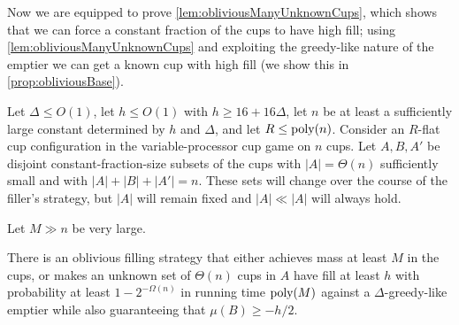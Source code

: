 Now we are equipped to prove \cref{lem:obliviousManyUnknownCups},
which shows that we can force a constant fraction of the cups to
have high fill; using \cref{lem:obliviousManyUnknownCups} and
exploiting the greedy-like nature of the emptier we can get a
known cup with high fill (we show this in
\cref{prop:obliviousBase}).
\begin{lemma}
  \label{lem:obliviousManyUnknownCups}
  Let $\Delta \le O(1)$, let $h \le O(1)$ with $h \ge
  16+16\Delta$, let $n$ be at least a sufficiently large constant
  determined by $h$ and $\Delta$, and let $R \le \operatorname{\text{poly}}(n)$.
  Consider an $R$-flat cup configuration in the
  variable-processor cup game on $n$ cups.
  Let $A, B, A'$ be disjoint constant-fraction-size subsets of
  the cups with $|A| = \Theta(n)$ sufficiently small and with
  $|A| + |B| + |A'| = n$. These sets will change over the course
  of the filler's strategy, but $|A|$ will remain fixed and $|A|
  \ll |A|$ will always hold.

  Let $M\gg n$ be very large.

  There is an oblivious filling strategy that either achieves
  mass at least $M$ in the cups, or makes an unknown
  set of $\Theta(n)$ cups in $A$ have fill at least $h$ with
  probability at least $1-2^{-\Omega(n)}$ in running time
  $\operatorname{\text{poly}}(M)$ against a $\Delta$-greedy-like emptier while also
  guaranteeing that $\mu(B) \ge -h/2$.
\end{lemma}
